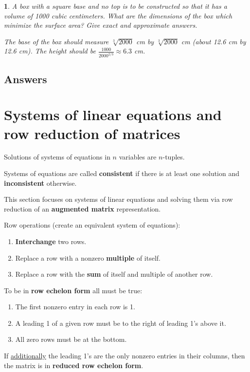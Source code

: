 \documentclass{amsbook}
\newtheorem{exc}{}
\newenvironment{ex}{\begin{exc}\normalfont}{\end{exc}}
\numberwithin{section}{chapter}
\numberwithin{equation}{chapter}
\begin{document}
	\begin{ex}
	 A box with a square base and no top is to be constructed so that it has a volume of 1000 cubic centimeters. What are the dimensions of the box which minimize the surface area? Give exact and approximate answers.
	\begin{sol}
		The base of the box should measure $\sqrt[3]{2000}$ cm by $\sqrt[3]{2000}$ cm (about 12.6 cm by 12.6 cm). The height should be $\frac{1000}{2000^{2/3}} \approx 6.3$ cm.
	\end{sol}
\end{ex}

\subsection*{Answers \nopunct} \hfill
\begin{multicols}{2}
	
\end{multicols}




\newpage
\section{Systems of linear equations and row reduction of matrices}

Solutions of systems of equations in $n$ variables are $n$-tuples.

Systems of equations are called \textbf{consistent} if there is at least one solution and \textbf{inconsistent} otherwise.

This section focuses on systems of linear equations and solving them via row reduction of an \textbf{augmented matrix} representation.

Row operations (create an equivalent system of equations):
\begin{enumerate}
	\item \textbf{Interchange} two rows.
	\item Replace a row with a nonzero \textbf{multiple} of itself.
	\item Replace a row with the \textbf{sum} of itself and multiple of another row.
\end{enumerate}

\bigskip
To be in  \textbf{row echelon form} all must be true:
\begin{enumerate}
	\item The first nonzero entry in each row is 1.
	\item A leading 1 of a given row must be to the right of leading 1's above it.
	\item All zero rows must be at the bottom.
\end{enumerate}
If \underline{additionally} the leading 1's are the only nonzero entries in their columns, then the matrix is in \textbf{reduced row echelon form}.
\end{document}
